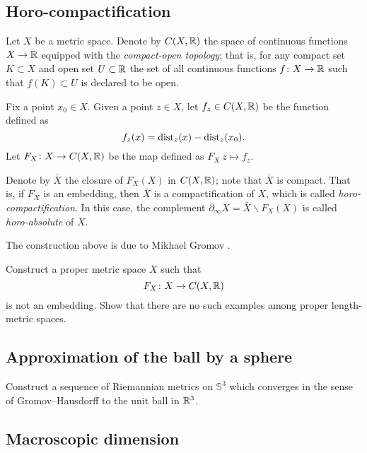 \subsection*{Horo-compactification\easy}
\label{Horocompactification}

Let $X$ be a metric space.
Denote by $C(X,\mathbb{R})$ the space of continuous functions $X\to \mathbb{R}$
equipped with the \emph{compact-open topology};
that is, for any compact set $K\subset X$ and open set $U\subset \mathbb{R}$
the set of all continuous functions $f\colon X\to \mathbb{R}$ such that $f(K)\subset U$
is declared to be open.

Fix a point $x_0\in X$.
Given a point $z\in X$, let $f_z\in C(X,\mathbb{R})$ be the function defined as 
\[f_z(x)=\operatorname{\rm dist}\nolimits_z(x)-\operatorname{\rm dist}\nolimits_z(x_0).\]
Let $F_X\colon X\to C(X,\mathbb{R})$ be the map 
defined as $F_X\:z\mapsto f_z$.

Denote by $\bar X$ 
the closure of $F_X(X)$ in $C(X,\mathbb{R})$;
note that $\bar X$ is compact.
That is, 
if $F_X$ is an embedding, 
then $\bar X$ is a compactification of $X$,
which is called \emph{horo-compactification}.
In this case, the complement 
$\partial_\infty X=\bar X\backslash F_X(X)$ 
is called {}\emph{horo-absolute} of $X$.

The construction above is due to Mikhael Gromov \cite[see][]{gromov-hyperbolic}.

\begin{pr}
Construct a proper metric space $X$
such that 
\[F_X\colon X\to C(X,\mathbb{R})\] 
is not an embedding.
Show that there are no such examples among proper length-metric spaces.
\end{pr}

\subsection*{Approximation of the ball by a sphere}
\label{3-sphere is close to a ball}

\begin{pr}
Construct a sequence of Riemannian metrics on $\mathbb{S}^3$ 
which converges in the sense of Gromov--Hausdorff 
to the unit ball in $\mathbb{R}^3$.
\end{pr}

\subsection*{Macroscopic dimension\easy}
\label{macroscopic dimension} 


